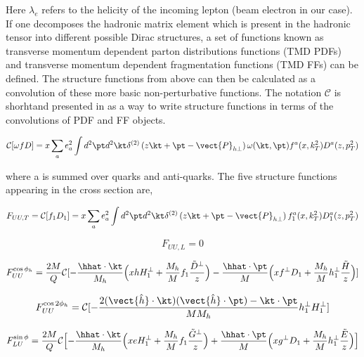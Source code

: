 Here $\lambda_e$ refers to the helicity of the incoming lepton (beam electron in our case).  If one decomposes the hadronic matrix element which is present in the hadronic tensor into different possible Dirac structures, a set of functions known as transverse momentum dependent parton distributions functions (TMD PDFs) and transverse momentum dependent fragmentation functions (TMD FFs) can be defined.  The structure functions from above can then be calculated as a convolution of these more basic non-perturbative functions.  The notation $\mathcal{C}$ is shorhtand  presented in \cite{bacchetta} as a way to write structure functions in terms of the convolutions of PDF and FF objects.

\begin{equation}
  \mathcal{C}[\omega f D] = x \sum_{a} e^{2}_{a} \int d^{2}\pt d^{2}\kt \delta^{(2)} \left( z\kt + \pt - \vect{P}_{h\perp} \right) \omega (\kt, \pt) f^{a}(x, k_{T}^{2}) D^{a}(z, p_{T}^{2}) 
\end{equation}

where a is summed over quarks and anti-quarks.  The five structure functions appearing in the cross section are, 

\begin{equation}
F_{UU,T} = \mathcal{C}[f_1 D_1] = x \sum_{a} e^{2}_{a} \int d^{2} \pt d^{2} \kt \delta^{(2)} \left( z\kt + \pt - \vect{P}_{h\perp} \right) f_{1}^{a}(x, k_{T}^{2}) D_{1}^{a}(z, p_{T}^{2})
\end{equation}

\begin{equation}
F_{UU,L} = 0
\end{equation}

\begin{equation}
F_{UU}^{\cos \phi_h} = \frac{2M}{Q} \mathcal{C}[ - \frac{\hhat \cdot \kt}{M_h} \Bigl( x h H_{1}^{\perp} + \frac{M_h}{M} f_1 \frac{\tilde{D}^{\perp}}{z} \Bigr) - \frac{\hhat \cdot \pt}{M} \Bigl( x f^{\perp} D_1 + \frac{M_h}{M} h_1^{\perp} \frac{\tilde{H}}{z} \Bigr)]
\end{equation}

\begin{equation}
F_{UU}^{\cos 2\phi_h} = \mathcal{C}[- \frac{2 (\vect{\hat{h}} \cdot \kt) (\vect{\hat{h}} \cdot \pt) - \kt \cdot \pt}{M M_h} h_{1}^{\perp} H_{1}^{\perp} ]
\end{equation}

\begin{equation}
  F_{LU}^{\sin\phi} = \frac{2M}{Q} \mathcal{C} \Bigl[ -\frac{\hhat \cdot \kt}{M_h} \Bigl( xeH_1^\perp + \frac{M_h}{M} f_1 \frac{\tilde{G}^\perp}{z} \Bigr) + \frac{\hhat \cdot \pt}{M} \Bigl( xg^\perp D_1 + \frac{M_h}{M} h_{1}^{\perp} \frac{\tilde{E}}{z} \Bigr) \Bigr]
\end{equation}

